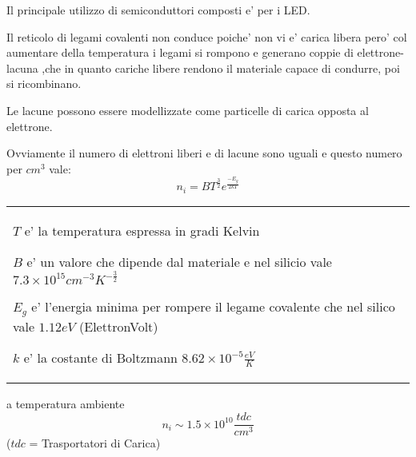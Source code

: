 \documentclass[\main/main.tex]{subfiles}
\begin{document}
Il principale utilizzo di semiconduttori composti e' per i LED.

Il reticolo di legami covalenti non conduce poiche' non vi e' carica libera pero' col aumentare della temperatura i legami si rompono e generano coppie di elettrone-lacuna ,che in quanto cariche libere rendono il materiale capace di condurre, poi si ricombinano.

Le lacune possono essere modellizzate come particelle di carica opposta al elettrone.

Ovviamente il numero di elettroni liberi e di lacune sono uguali e questo numero per $cm^3$ vale:
\[n_i = BT^{\frac{3}{2}}e^{\frac{-E_g}{2kT}}\]
\begin{tabular}{l}
	$T$ e' la temperatura espressa in gradi Kelvin
	
	$B$ e' un valore che dipende dal materiale e nel silicio vale $7.3 \times 10^{15} cm^{-3} K^{-\frac{3}{2}}$
	
	$E_g$ e' l'energia minima per rompere il legame covalente che nel silico vale $1.12 eV$ (ElettronVolt)
	
	$k$ e' la costante di Boltzmann $8.62 \times 10^{-5} \frac{eV}{K}$
\end{tabular}
a temperatura ambiente \[n_i \sim 1.5 \times 10^{10} \frac{tdc}{cm^3}\]
($tdc$ = Trasportatori di Carica)
\clearpage
\end{document}
